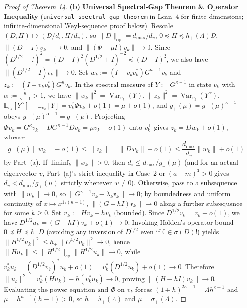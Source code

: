 \documentclass[10pt,letterpaper]{article}
\newcommand{\op}{\mathrm{op}}
\newcommand{\Var}{\operatorname{Var}}
\begin{document}
\begin{proof}[Proof of Theorem 14]
\textbf{(b) Universal Spectral-Gap Theorem \& Operator Inequality} (\texttt{universal\_spectral\_gap\_theorem} in Lean~4 for finite dimensions; infinite-dimensional Weyl-sequence proof below).
Rescale $(D, H) \mapsto (D/d_v, H/d_v)$, so $\|D\|_{\op} = d_{\max}/d_v$, $0 \preceq H \preceq h_+(\Lambda) D$, $\|(D - I)v_k\| \to 0$, and $\|(\Phi - \mu I)v_k\| \to 0$. Since $(D^{1/2} - I)^2 = (D - I)^2(D^{1/2} + I)^{-2} \preceq (D - I)^2$, we also have $\|(D^{1/2} - I)v_k\| \to 0$. Set $w_k := (I - v_k v_k^*) G^{\kappa - 1} v_k$ and $z_k := (I - v_k v_k^*) G^\kappa v_k$. In the spectral measure of $Y := G^{\kappa - 1}$ in state $v_k$ with $\alpha := \frac{\kappa}{\kappa - 1} > 1$, we have $\|w_k\|^2 = \Var_{v_k}(Y)$, $\|z_k\|^2 = \Var_{v_k}(Y^\alpha)$, $\mathbb{E}_{v_k}[Y^\alpha] - \mathbb{E}_{v_k}[Y] = v_k^* \Phi v_k + o(1) = \mu + o(1)$, and $y_+(\mu) = g_+(\mu)^{\kappa - 1}$ obeys $y_+(\mu)^{\alpha - 1} = g_+(\mu)$. Projecting $\Phi v_k = G^\kappa v_k - D G^{\kappa - 1} D v_k = \mu v_k + o(1)$ onto $v_k^\perp$ gives $z_k = D w_k + o(1)$, whence
\[
  g_+(\mu)\|w_k\| - o(1) \le \|z_k\| = \|D w_k\| + o(1) \le \frac{d_{\max}}{d_v}\|w_k\| + o(1)
\]
by Part~(a). If $\liminf_k \|w_k\| > 0$, then $d_v \le d_{\max}/g_+(\mu)$ (and for an actual eigenvector $v$, Part~(a)'s strict inequality in Case~2 or $(a - m)^2 > 0$ gives $d_v < d_{\max}/g_+(\mu)$ strictly whenever $w \neq 0$). Otherwise, pass to a subsequence with $\|w_k\| \to 0$, so $\|G^{\kappa-1} v_k - \lambda_k v_k\| \to 0$; by boundedness and uniform continuity of $x \mapsto x^{1/(\kappa-1)}$, $\|(G - hI)v_k\| \to 0$ along a further subsequence for some $h \ge 0$. Set $u_k := H v_k - h v_k$ (bounded). Since $D^{1/2} v_k = v_k + o(1)$, we have $D^{1/2} u_k = (G - hI)v_k + o(1) \to 0$. Invoking Holden's operator bound $0 \preceq H \preceq h_+ D$ (avoiding any inversion of $D^{1/2}$ even if $0 \in \sigma(D)$!) yields $\|H^{1/2} u_k\|^2 \le h_+ \|D^{1/2} u_k\|^2 \to 0$, hence $\|H u_k\| \le \|H^{1/2}\|_{\op}\|H^{1/2} u_k\| \to 0$, while $v_k^* u_k = (D^{1/2} v_k)^* u_k + o(1) = v_k^*(D^{1/2} u_k) + o(1) \to 0$. Therefore $\|u_k\|^2 = v_k^*(H u_k) - h(v_k^* u_k) \to 0$, proving $\|(H - hI)v_k\| \to 0$. Evaluating the power equation and $\Phi$ on $v_k$ forces $(1+h)^{2\kappa-1} = \Lambda h^{\kappa-1}$ and $\mu = h^{\kappa-1}(h-1) > 0$, so $h = h_+(\Lambda)$ and $\mu = \sigma_+(\Lambda)$.


\end{proof}
\end{document}
